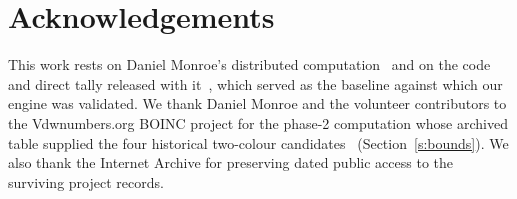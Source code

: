 \section*{Acknowledgements}

This work rests on Daniel Monroe's distributed computation~\cite{Monroe2026}
and on the code and direct tally released with it~\cite{MonroeCodeTally}, which
served as the baseline against which our engine was validated. We thank Daniel
Monroe and the volunteer contributors to the Vdwnumbers.org BOINC project for
the phase-2 computation whose archived table supplied the four historical
two-colour candidates~\cite{MonroePhase2Archive} (Section~\ref{s:bounds}). We
also thank the Internet Archive for preserving dated public access to the
surviving project records.
